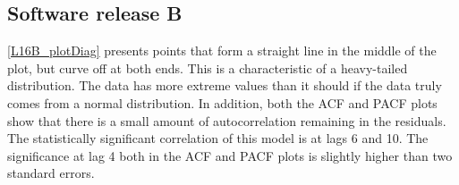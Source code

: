 \subsection{Software release B}

\ref{L16B_plotDiag} presents points that form a straight line in
the middle of the plot, but curve off at both ends. This is a characteristic
of a heavy-tailed distribution. The data has more extreme values than
it should if the data truly comes from a normal distribution. In addition,
both the ACF and PACF plots show that there is a small amount of autocorrelation
remaining in the residuals. The statistically significant correlation
of this model is at lags 6 and 10. The significance at lag 4 both
in the ACF and PACF plots is slightly higher than two standard errors.

\begin{figure}[H]
\begin{centering}

\end{centering}
\end{figure}
